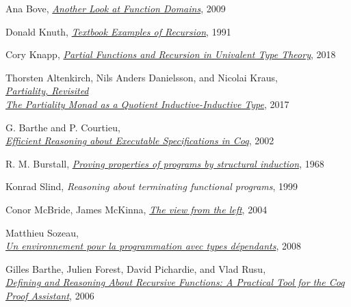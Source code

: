 \documentclass[declaration,mgr,english,shortabstract]{iithesis}
\begin{document}
\begin{thebibliography}{1}
    Ana Bove,
    \href{https://core.ac.uk/download/pdf/82578788.pdf}{\textit{Another Look at Function Domains}},
    2009

    Donald Knuth,
    \href{https://arxiv.org/pdf/cs/9301113.pdf}{\textit{Textbook Examples of Recursion}},
    1991

    Cory Knapp,
    \href{https://etheses.bham.ac.uk//id/eprint/8448/4/Knapp18PhD.pdf}{\textit{Partial Functions and Recursion in Univalent Type Theory}},
    2018

    Thorsten Altenkirch, Nils Anders Danielsson, and Nicolai Kraus, \\
    \href{https://arxiv.org/pdf/1610.09254.pdf}{\textit{Partiality, Revisited \\The Partiality Monad as a Quotient Inductive-Inductive Type}},
    2017

    G. Barthe and P. Courtieu, \\
    \href{https://www.researchgate.net/publication/221302198_Efficient_Reasoning_about_Executable_Specifications_in_Coq}{\textit{Efficient Reasoning about Executable Specifications in Coq}},
    2002

    R. M. Burstall,
    \href{http://www.cse.chalmers.se/edu/year/2010/course/DAT140_Types/Burstall.pdf}{\textit{Proving properties of programs by structural induction}},
    1968

    Konrad Slind,
    \textit{Reasoning about terminating functional programs},
    1999

    Conor McBride, James McKinna,
    \href{https://www.researchgate.net/publication/220676549_The_view_from_the_left}{\textit{The view from the left}},
    2004

    Matthieu Sozeau, \\
    \href{https://www.irif.fr/~sozeau/research/publications/thesis-sozeau.pdf}{\textit{Un environnement pour la programmation avec types d\'{e}pendants}},
    2008

    Gilles Barthe, Julien Forest, David Pichardie, and Vlad Rusu, \\
    \href{https://www.researchgate.net/publication/48415012_Defining_and_Reasoning_About_Recursive_Functions_A_Practical_Tool_for_the_Coq_Proof_Assistant}{\textit{Defining and Reasoning About Recursive Functions: A Practical Tool for the Coq Proof Assistant}},
    2006


\end{thebibliography}
\end{document}
